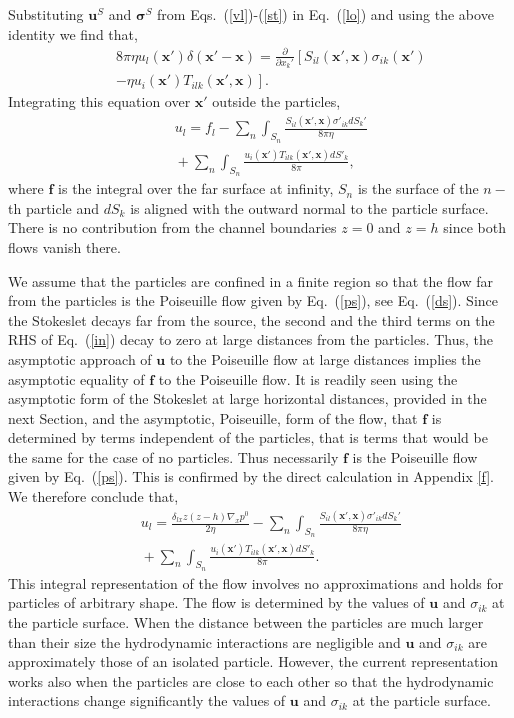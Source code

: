 Substituting $\bm u^S$ and $\bm \sigma^S$ from Eqs.~(\ref{vl})-(\ref{st}) in Eq.~(\ref{lo}) and using the above identity we find that,
\begin{eqnarray}&&
8\pi \eta u_{l}(\bm x')\delta(\bm x'-\bm x)=\frac{\partial}{\partial x_k'}\left[S_{il}(\bm x', \bm x)\sigma_{ik}(\bm x')
\right.\nonumber\\&&\left.-\eta u_{i}(\bm x')T_{ilk}(\bm x', \bm x)\right].\label{fd}
\end{eqnarray}
Integrating this equation over $\bm x'$ outside the particles,
\begin{eqnarray}&&\!\!\!\!\!\!\!\!\!\!\!\!\!\!\!\!
u_l\!=\!f_l\!-\!\sum_n\int_{S_n}\!\!\!\frac{S_{il}(\bm x', \bm x)\sigma'_{ik}dS_k'}{8\pi \eta}\nonumber\\&&\!\!\!\!\!\!\!\!\!\!\!\!\!\!\!\!
+\sum_n\int_{S_n}\frac{u_{i}(\bm x')T_{ilk}(\bm x'\!, \!\bm x)dS'_k}{8\pi},\label{in}
\end{eqnarray}
where $\bm f$ is the integral over the far surface at infinity,  $S_n$ is the surface of the $n-$th particle and $dS_k$ is aligned with the outward normal to the particle surface. There is no contribution from the channel boundaries $z=0$ and $z=h$ since both flows vanish there.

We assume that the particles are confined in a finite region so that the flow far from the particles is the Poiseuille flow given by Eq.~(\ref{ps}), see Eq.~(\ref{ds}). Since the Stokeslet decays far from the source, the second and the third terms on the RHS of Eq.~(\ref{in}) decay to zero at large distances from the particles.
 Thus, the asymptotic approach of $\bm u$ to the Poiseuille flow at large distances implies the asymptotic equality of $\bm f$ to the Poiseuille flow. It is readily seen using the asymptotic form of the Stokeslet at large horizontal distances, provided in the next Section, and the asymptotic, Poiseuille, form of the flow, that $\bm f$ is determined by terms independent of the particles, that is terms that would be the same for the case of no particles.
Thus necessarily $\bm f$ is the Poiseuille flow given by Eq.~(\ref{ps}). This is confirmed by the direct calculation in Appendix \ref{f}. We therefore conclude that,
\begin{eqnarray}&&\!\!\!\!\!\!\!\!\!\!\!\!\!\!\!\!
u_l\!=\!\frac{\delta_{lx}z(z\!-\!h)\nabla_x p^0}{2\eta}\!-\!\sum_n\int_{S_n}\!\!\!\frac{S_{il}(\bm x', \bm x)\sigma'_{ik}dS_k'}{8\pi \eta}\nonumber\\&&\!\!\!\!\!\!\!\!\!\!\!\!\!\!\!\!
+\sum_n\int_{S_n}\frac{u_{i}(\bm x')T_{ilk}(\bm x'\!, \!\bm x)dS'_k}{8\pi}.\label{inrep}
\end{eqnarray}
This integral representation of the flow involves no approximations and holds for particles of arbitrary shape. The flow is determined by the values of $\bm u$ and $\sigma_{ik}$ at the particle surface. When the distance between the particles are much larger than their size the hydrodynamic interactions are negligible and $\bm u$ and $\sigma_{ik}$ are approximately those of an isolated particle. However, the current representation works also when the particles are close to each other so that the hydrodynamic interactions change significantly the values of $\bm u$ and $\sigma_{ik}$ at the particle surface.

